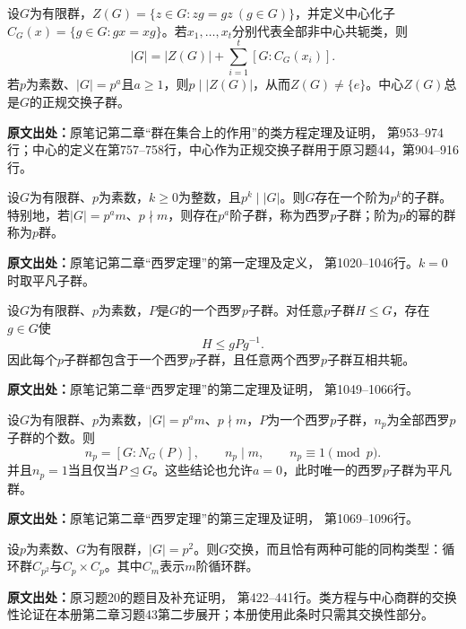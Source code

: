 \begin{reviewtheorem}\label{tool:a-class-equation}
设$G$为有限群，$Z(G)=\{z\in G:zg=gz\ (g\in G)\}$，并定义中心化子$C_G(x)=\{g\in G:gx=xg\}$。若$x_1,\ldots,x_t$分别代表全部非中心共轭类，则
\[
|G|=|Z(G)|+\sum_{i=1}^t[G:C_G(x_i)].
\]
若$p$为素数、$|G|=p^a$且$a\ge1$，则$p\mid|Z(G)|$，从而$Z(G)\ne\{e\}$。中心$Z(G)$总是$G$的正规交换子群。

\textbf{原文出处：}原笔记第二章“群在集合上的作用”的类方程定理及证明， 第953--974行；中心的定义在第757--758行，中心作为正规交换子群用于原习题44，第904--916行。
\end{reviewtheorem}

\begin{reviewtheorem}\label{tool:a-sylow-existence}
设$G$为有限群、$p$为素数，$k\ge0$为整数，且$p^k\mid|G|$。则$G$存在一个阶为$p^k$的子群。特别地，若$|G|=p^am$、$p\nmid m$，则存在$p^a$阶子群，称为西罗$p$子群；阶为$p$的幂的群称为$p$群。

\textbf{原文出处：}原笔记第二章“西罗定理”的第一定理及定义， 第1020--1046行。$k=0$时取平凡子群。
\end{reviewtheorem}

\begin{reviewtheorem}\label{tool:a-sylow-conjugacy}
设$G$为有限群、$p$为素数，$P$是$G$的一个西罗$p$子群。对任意$p$子群$H\le G$，存在$g\in G$使
\[
H\le gPg^{-1}.
\]
因此每个$p$子群都包含于一个西罗$p$子群，且任意两个西罗$p$子群互相共轭。

\textbf{原文出处：}原笔记第二章“西罗定理”的第二定理及证明， 第1049--1066行。
\end{reviewtheorem}

\begin{reviewtheorem}\label{tool:a-sylow-count}
设$G$为有限群、$p$为素数，$|G|=p^am$、$p\nmid m$，$P$为一个西罗$p$子群，$n_p$为全部西罗$p$子群的个数。则
\[
n_p=[G:N_G(P)],\qquad n_p\mid m,\qquad n_p\equiv1\pmod p.
\]
并且$n_p=1$当且仅当$P\trianglelefteq G$。这些结论也允许$a=0$，此时唯一的西罗$p$子群为平凡群。

\textbf{原文出处：}原笔记第二章“西罗定理”的第三定理及证明， 第1069--1096行。
\end{reviewtheorem}

\begin{reviewprop}\label{tool:a-p-square-abelian}
设$p$为素数、$G$为有限群，$|G|=p^2$。则$G$交换，而且恰有两种可能的同构类型：循环群$C_{p^2}$与$C_p\times C_p$。其中$C_m$表示$m$阶循环群。

\textbf{原文出处：}原习题20的题目及补充证明， 第422--441行。类方程与中心商群的交换性论证在本册第二章习题43第二步展开；本册使用此条时只需其交换性部分。
\end{reviewprop}

